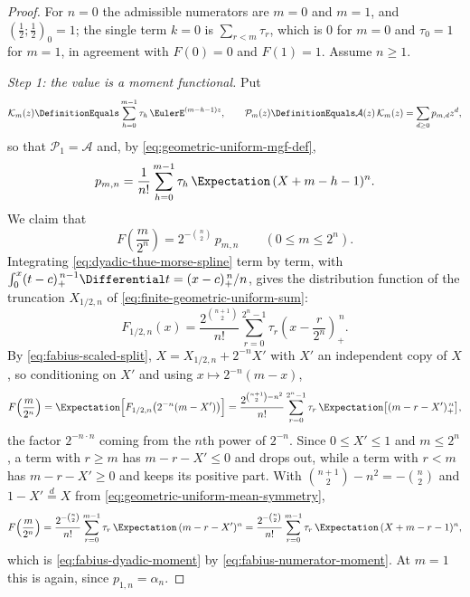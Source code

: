 \documentclass[11pt,a4paper,oneside,openany]{book}
\theoremstyle{definition}
\theoremstyle{remark}
\begin{document}
\begin{proof}
For $n=0$ the admissible numerators are $m=0$ and $m=1$, and
$\left(\tfrac12;\tfrac12\right)_0=1$; the single term $k=0$ is $\sum_{r<m}\tau_r$,
which is $0$ for $m=0$ and $\tau_0=1$ for $m=1$, in agreement with $F(0)=0$ and
$F(1)=1$.  Assume $n\ge1$.

\emph{Step 1: the value is a moment functional.}  Put
\begin{equation}\label{eq:fabius-numerator-series}
 \mathcal K_m(z)\DefinitionEquals\sum_{h=0}^{m-1}\tau_h\,\EulerE^{(m-h-1)z},
 \qquad
 \mathcal P_m(z)\DefinitionEquals\mathcal A(z)\,\mathcal K_m(z)=\sum_{d\ge0}p_{m,d}z^d,
\end{equation}
so that $\mathcal P_1=\mathcal A$ and, by \eqref{eq:geometric-uniform-mgf-def},
\begin{equation}\label{eq:fabius-numerator-moment}
 p_{m,n}=\frac1{n!}\sum_{h=0}^{m-1}\tau_h\,\Expectation\,(X+m-h-1)^n .
\end{equation}
We claim that
\begin{equation}\label{eq:fabius-dyadic-moment}
 F\!\left(\frac m{2^n}\right)=2^{-\binom n2}\,p_{m,n}
 \qquad(0\le m\le2^n).
\end{equation}
Integrating \eqref{eq:dyadic-thue-morse-spline} term by term, with
$\int_0^x(t-c)_+^{\,n-1}\Differential t=(x-c)_+^{\,n}/n$, gives the distribution function of the
truncation $X_{1/2,n}$ of \eqref{eq:finite-geometric-uniform-sum}:
\[
 F_{1/2,n}(x)
 =\frac{2^{\binom{n+1}{2}}}{n!}\sum_{r=0}^{2^n-1}\tau_r
   \left(x-\frac r{2^n}\right)_+^{\,n}.
\]
By \eqref{eq:fabius-scaled-split}, $X=X_{1/2,n}+2^{-n}X'$ with $X'$ an independent
copy of $X$, so conditioning on $X'$ and using $x\mapsto2^{-n}(m-x)$,
\[
 F\!\left(\frac m{2^n}\right)
 =\Expectation\Bigl[F_{1/2,n}\bigl(2^{-n}(m-X')\bigr)\Bigr]
 =\frac{2^{\binom{n+1}{2}-n^2}}{n!}
  \sum_{r=0}^{2^n-1}\tau_r\,\Expectation\bigl[(m-r-X')_+^{\,n}\bigr],
\]
the factor $2^{-n\cdot n}$ coming from the $n$th power of $2^{-n}$.  Since
$0\le X'\le1$ and $m\le2^n$, a term with $r\ge m$ has $m-r-X'\le0$ and drops out,
while a term with $r<m$ has $m-r-X'\ge0$ and keeps its positive part.  With
$\binom{n+1}{2}-n^2=-\binom n2$ and $1-X'\overset d=X$ from
\eqref{eq:geometric-uniform-mean-symmetry},
\[
 F\!\left(\frac m{2^n}\right)
 =\frac{2^{-\binom n2}}{n!}\sum_{r=0}^{m-1}\tau_r\,\Expectation\,(m-r-X')^n
 =\frac{2^{-\binom n2}}{n!}\sum_{r=0}^{m-1}\tau_r\,\Expectation\,(X+m-r-1)^n,
\]
which is \eqref{eq:fabius-dyadic-moment} by \eqref{eq:fabius-numerator-moment}.  At
$m=1$ this is  again, since $p_{1,n}=\alpha_n$.


\end{proof}
\end{document}
